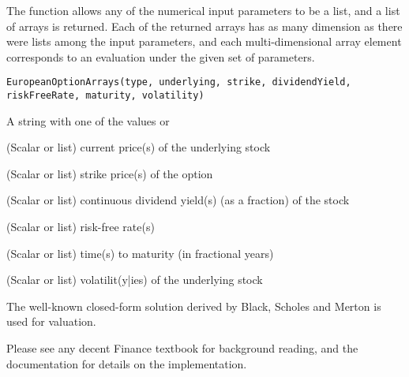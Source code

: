 \begin{Description}\relax
The  function allows any of the numerical
input parameters to be a list, and a list of arrays is returned. Each
of the returned arrays has as many dimension as there were lists among
the input parameters, and each multi-dimensional array element
corresponds to an evaluation under the given set of parameters.
\end{Description}
\begin{Usage}
\begin{verbatim}
EuropeanOptionArrays(type, underlying, strike, dividendYield, riskFreeRate, maturity, volatility)
\end{verbatim}
\end{Usage}
\begin{Arguments}
\begin{ldescription}
\item[\code{type}] A string with one of the values  or 
\item[\code{underlying}] (Scalar or list) current price(s) of the underlying stock
\item[\code{strike}] (Scalar or list) strike price(s) of the option
\item[\code{dividendYield}] (Scalar or list) continuous dividend yield(s) (as a fraction) of the stock
\item[\code{riskFreeRate}] (Scalar or list) risk-free rate(s)
\item[\code{maturity}] (Scalar or list) time(s) to maturity (in fractional years)
\item[\code{volatility}] (Scalar or list) volatilit(y|ies) of the underlying stock
\end{ldescription}
\end{Arguments}
\begin{Details}\relax
The well-known closed-form solution derived by Black, Scholes and
Merton is used for valuation. 

Please see any decent Finance textbook for background reading, and the
 documentation for details on the 
implementation.
\end{Details}
